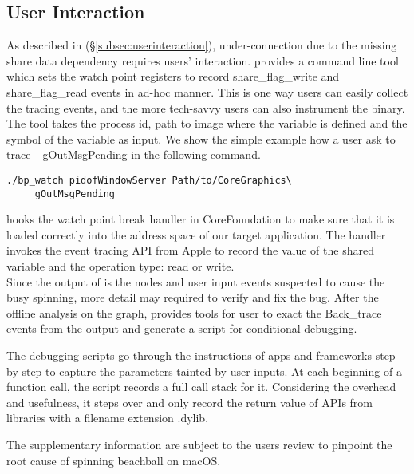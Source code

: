 
\subsection{User Interaction}\label{subsec:tcp}

As described in (\S\ref{subsec:userinteraction}), under-connection due
to the missing share data dependency requires users' interaction. \xxx
provides a command line tool which sets the watch point registers to record
share\_flag\_write and share\_flag\_read events in ad-hoc manner. This is one
way users can easily collect the tracing events, and the more tech-savvy users
can also instrument the binary. The tool takes the process id, path to image
where the variable is defined and the symbol of the variable as input. We
show the simple example how a user ask \xxx to trace \_gOutMsgPending in the
following command.

\begin{lstlisting}
./bp_watch pidofWindowServer Path/to/CoreGraphics\
	_gOutMsgPending
\end{lstlisting}

\xxx hooks the watch point break handler in CoreFoundation to make sure that it is
loaded correctly into the address space of our target application. The handler
invokes the event tracing API from Apple to record the value of the shared
variable and the operation type: read or write.
\\
Since the output of \xxx is the nodes and user input events suspected to cause
the busy spinning, more detail may required to verify and fix the bug. After
the offline analysis on the graph, \xxx provides tools for user to exact
the Back\_trace events from the output and generate a script for conditional
debugging.

The debugging scripts go through the instructions of apps and frameworks step
by step to capture the parameters tainted by user inputs. At each beginning of
a function call, the script records a full call stack for it. Considering the
overhead and usefulness, it steps over and only record the return value of APIs
from libraries with a filename extension .dylib.

The supplementary information are subject to the users review to pinpoint the
root cause of spinning beachball on macOS.

